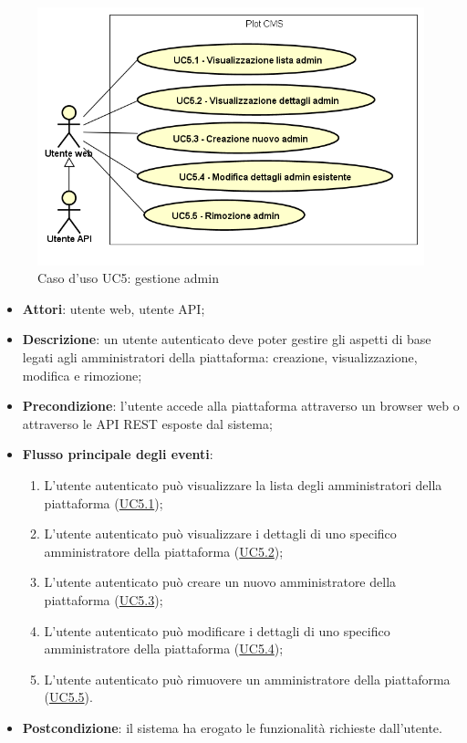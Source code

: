         \begin{figure}
            \centering
            \includegraphics[scale=0.95, width=\textwidth]{immagini/usecase/UC5.png}
            \caption{Caso d'uso UC5: gestione admin}\label{fig:UC5} 
        \end{figure}
\begin{itemize}
\item \textbf{Attori}: utente web, utente API;
\item \textbf{Descrizione}: un utente autenticato deve poter gestire gli aspetti di base legati agli amministratori della piattaforma: creazione, visualizzazione, modifica e rimozione; 
      \item \textbf{Precondizione}: l'utente accede alla piattaforma attraverso un browser web o attraverso le API REST esposte dal sistema;

        \item \textbf{Flusso principale degli eventi}:
          \begin{enumerate}
          \item L'utente autenticato può visualizzare la lista degli amministratori della piattaforma (\hyperlink{UC5.1}{UC5.1});
          \item L'utente autenticato può visualizzare i dettagli di uno specifico amministratore della piattaforma (\hyperlink{UC5.2}{UC5.2});
          \item L'utente autenticato può creare un nuovo amministratore della piattaforma (\hyperlink{UC5.3}{UC5.3});
          \item L'utente autenticato può modificare i dettagli di uno specifico amministratore della piattaforma (\hyperlink{UC5.4}{UC5.4});
          \item L'utente autenticato può rimuovere un amministratore della piattaforma (\hyperlink{UC5.5}{UC5.5}).

      \end{enumerate}
    \item \textbf{Postcondizione}: il sistema ha erogato le funzionalità richieste dall'utente.
  \end{itemize}
\hypertarget{UC5.1}{}
